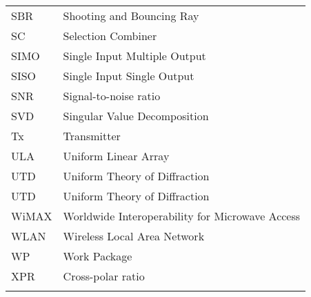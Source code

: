 \begin{tabular}{ll}
\\

SBR & Shooting and Bouncing Ray\\

SC & Selection Combiner\\

SIMO & Single Input Multiple Output\\

SISO & Single Input Single Output\\

SNR & Signal-to-noise ratio\\

SVD & Singular Value Decomposition\\

Tx & Transmitter\\

ULA & Uniform Linear Array \\


UTD & Uniform Theory of Diffraction\\


UTD & Uniform Theory of Diffraction\\

WiMAX & Worldwide Interoperability for Microwave Access\\

WLAN & Wireless Local Area Network\\

WP & Work Package\\

XPR & Cross-polar ratio\\



\\
\end{tabular}


\newpage

\setcounter{page}{1} %
\pagestyle{fancy}
